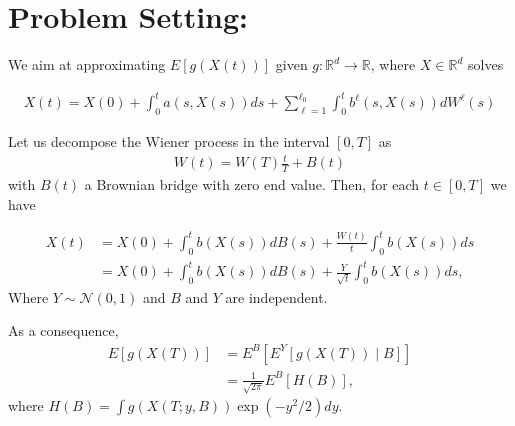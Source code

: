 \documentclass[11pt]{article}
\begin{document}
%
%	



\section{Problem Setting:}

We aim at approximating $E[g(X(t))]$ given $g:\mathbb{R}^d  \rightarrow \mathbb{R}$, where $X \in \mathbb{R}^d$ solves 

\begin{align}
	X(t)=X(0)+ \int_{0}^{t} a(s,X(s)) ds + \sum_{\ell=1}^{\ell_0} \int_{0}^{t} b^{\ell}(s,X(s)) dW^{\ell}(s)
\end{align}

Let us decompose the Wiener process in the interval $[0, T]$ as
\begin{align}
	W(t)=W(T) \frac{t}{T}+B(t)
\end{align}
with $B(t)$  a Brownian bridge with zero end value. Then,
for each $t \in [0, T]$ we have

\begin{align}
	X(t) &=X(0)+\int_{0}^{t} b(X(s)) dB(s)+\frac{W(t)}{t} \int_{0}^{t} b(X(s)) ds\nonumber\\
	&=X(0)+\int_{0}^{t} b(X(s)) dB(s)+\frac{Y}{\sqrt{t}} \int_{0}^{t} b(X(s))ds,
\end{align}
Where $Y \sim \mathcal{N}(0,1)$ and $B$ and $Y$ are independent.

As a consequence,
\begin{align}
	E[g(X(T))]&= E^B[E^Y[g(X(T))\mid B]]\nonumber\\
	&=\frac{1}{\sqrt{2 \pi}} E^B[H(B)],
\end{align}
where $H(B)=\int g(X(T;y,B)) \operatorname{exp}(-y^2/2) dy$.
\end{document}
